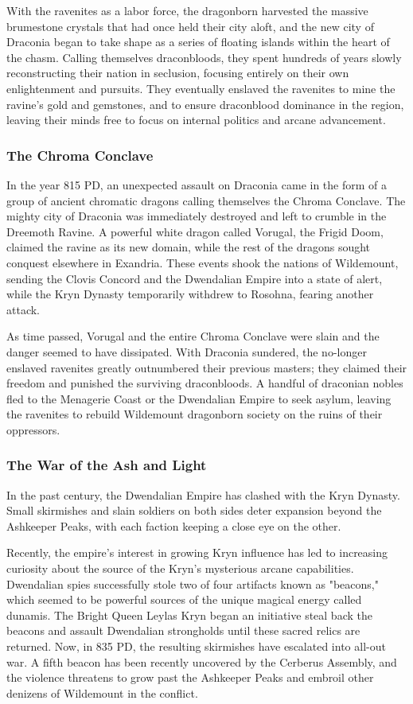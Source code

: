 \documentclass[10pt,a4paper,twoside,bg=print,twocolumn,openany,nodeprecatedcode]{dndbook}
\begin{document}
With the ravenites as a labor force, the dragonborn harvested the massive brumestone crystals that had once held their city aloft, and the new city of Draconia began to take shape as a series of floating islands within the heart of the chasm. Calling themselves draconbloods, they spent hundreds of years slowly reconstructing their nation in seclusion, focusing entirely on their own enlightenment and pursuits. They eventually enslaved the ravenites to mine the ravine's gold and gemstones, and to ensure draconblood dominance in the region, leaving their minds free to focus on internal politics and arcane advancement.

\subsubsection{The Chroma Conclave}
In the year 815 PD, an unexpected assault on Draconia came in the form of a group of ancient chromatic dragons calling themselves the Chroma Conclave. The mighty city of Draconia was immediately destroyed and left to crumble in the Dreemoth Ravine. A powerful white dragon called Vorugal, the Frigid Doom, claimed the ravine as its new domain, while the rest of the dragons sought conquest elsewhere in Exandria. These events shook the nations of Wildemount, sending the Clovis Concord and the Dwendalian Empire into a state of alert, while the Kryn Dynasty temporarily withdrew to Rosohna, fearing another attack.

As time passed, Vorugal and the entire Chroma Conclave were slain and the danger seemed to have dissipated. With Draconia sundered, the no-longer enslaved ravenites greatly outnumbered their previous masters; they claimed their freedom and punished the surviving draconbloods. A handful of draconian nobles fled to the Menagerie Coast or the Dwendalian Empire to seek asylum, leaving the ravenites to rebuild Wildemount dragonborn society on the ruins of their oppressors.

\subsubsection{The War of the Ash and Light}
In the past century, the Dwendalian Empire has clashed with the Kryn Dynasty. Small skirmishes and slain soldiers on both sides deter expansion beyond the Ashkeeper Peaks, with each faction keeping a close eye on the other.

Recently, the empire's interest in growing Kryn influence has led to increasing curiosity about the source of the Kryn's mysterious arcane capabilities. Dwendalian spies successfully stole two of four artifacts known as "beacons," which seemed to be powerful sources of the unique magical energy called dunamis. The Bright Queen Leylas Kryn began an initiative steal back the beacons and assault Dwendalian strongholds until these sacred relics are returned. Now, in 835 PD, the resulting skirmishes have escalated into all-out war. A fifth beacon has been recently uncovered by the Cerberus Assembly, and the violence threatens to grow past the Ashkeeper Peaks and embroil other denizens of Wildemount in the conflict.
\end{document}
